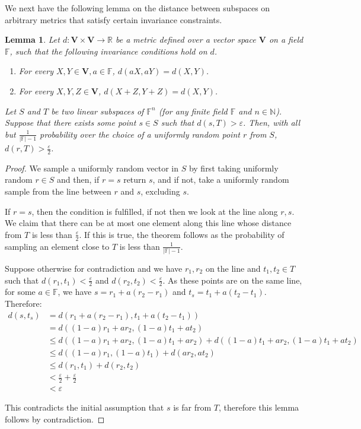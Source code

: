 \documentclass[10pt,a4paper]{article}
\newtheorem{lemma}[theorem]{Lemma}
\begin{document}
We next have the following lemma on the distance between subspaces on arbitrary metrics that satisfy certain invariance constraints.
\begin{lemma}
\label{linSub}
Let $d : \mathbf{V} \times \mathbf{V} \rightarrow \mathbb{R}$ be a metric defined over a vector space $\mathbf{V}$ on a field $\mathbb{F}$, such that the following invariance conditions hold on $d$.
\begin{enumerate}
    \item For every $X,Y\in\mathbf{V}, a\in \mathbb{F}$, $d(aX,aY)=d(X,Y)$.
    \item For every $X,Y,Z\in\mathbf{V}$, $d(X+Z,Y+Z)=d(X,Y)$.
\end{enumerate}

Let $S$ and $T$ be two linear subspaces of $\mathbb{F}^{n}$ (for any finite field $\mathbb{F}$ and $n\in \mathbb{N}$). Suppose that there exists some point $s\in S$ such that $d(s,T)>\varepsilon$. Then, with all but $\frac{1}{\vert \mathbb{F}\vert -1}$ probability over the choice of a uniformly random point $r$ from $S$, $d(r,T)>\frac{\varepsilon}{2}$.
\end{lemma}

\begin{proof}
We sample a uniformly random vector in $S$ by first taking uniformly random $r\in S$ and then, if $r=s$ return $s$, and if not, take a uniformly random sample from the line between $r$ and $s$, excluding $s$.

If $r=s$, then the condition is fulfilled, if not then we look at the line along $r,s$. We claim that there can be at most one element along this line whose distance from $T$ is less than $\frac{\varepsilon}{2}$. If this is true, the theorem follows as the probability of sampling an element close to $T$ is less than $\frac{1}{|\mathbb{F}|-1}$. 

Suppose otherwise for contradiction and we have $r_{1}, r_{2}$ on the line and $t_{1}, t_{2}\in T$ such that $d(r_{1}, t_{1})< \frac{\varepsilon}{2}$ and $d(r_{2}, t_{2}) < \frac{\varepsilon}{2}$. As these points are on the same line, for some $a\in \mathbb{F}$, we have  $s=r_{1}+a(r_{2}-r_{1})$ and $t_{s}=t_{1}+a(t_{2}-t_{1})$. Therefore:
\[
\begin{split}
    d(s,t_{s})&=d(r_{1}+a(r_{2}-r_{1}),t_{1}+a(t_{2}-t_{1}))\\
    &= d((1-a)r_{1}+ar_{2},(1-a)t_{1}+at_{2})\\
    &\leq d((1-a)r_{1}+ar_{2},(1-a)t_{1}+ar_{2})+d((1-a)t_{1}+ar_{2},(1-a)t_{1}+at_{2})\\
    &\leq d((1-a)r_{1},(1-a)t_{1})+d(ar_{2},at_{2})\\
    &\leq d(r_{1},t_{1})+d(r_{2},t_{2})\\
    &< \frac{\varepsilon}{2}+\frac{\varepsilon}{2}\\
    &< \varepsilon
\end{split}
\]

This contradicts the initial assumption that $s$ is far from $T$, therefore this lemma follows by contradiction.
\end{proof}
\end{document}
